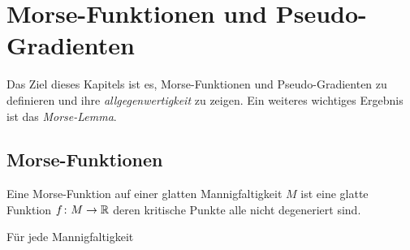 \chapter{Morse-Funktionen und Pseudo-Gradienten}

Das Ziel dieses Kapitels ist es, Morse-Funktionen und Pseudo-Gradienten zu
definieren und ihre 
\textit{allgegenwertigkeit} zu zeigen. Ein weiteres wichtiges Ergebnis ist
das \textit{Morse-Lemma}.

\section{Morse-Funktionen}

\begin{definition}
    \label{def: morse-funktion}
    Eine Morse-Funktion auf einer glatten Mannigfaltigkeit $M$ ist eine glatte Funktion
    $f \colon M \to { \mathbb R }$ deren kritische Punkte alle nicht degeneriert sind.
\end{definition}

\begin{prop}
    Für jede Mannigfaltigkeit 
\end{prop}
